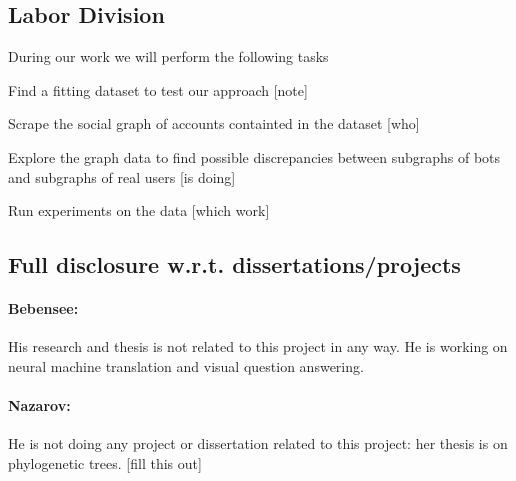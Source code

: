 
\subsection{Labor Division}

During our work we will perform the following tasks
\bit
\item Find a fitting dataset to test our approach [note]
\item Scrape the social graph of accounts containted in the dataset [who]
\item Explore the graph data to find possible discrepancies between subgraphs of bots and subgraphs of real users [is doing]
\item Run experiments on the data [which work]
\eit

\subsection{Full disclosure w.r.t. dissertations/projects}

\paragraph{Bebensee:}
His research and thesis is not related to this project in any way. He is working on neural machine translation and visual question answering.

\paragraph{Nazarov:}
He is not doing any project or dissertation
related to this project: her thesis is on phylogenetic trees. [fill this out]